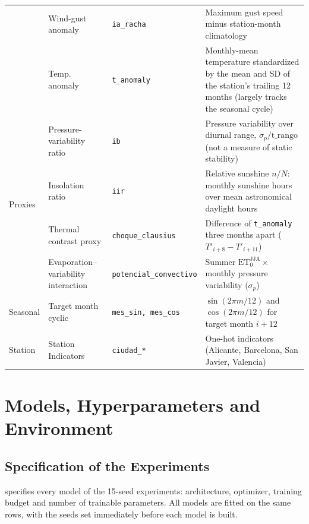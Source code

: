 \documentclass[11pt,a4paper]{article}
\begin{document}
\begin{table}[htbp]
{\begin{tabularx}{\textwidth}{lllX}
& Wind-gust anomaly & \texttt{ia\_racha} & Maximum gust speed minus station-month climatology \\
& Temp. anomaly & \texttt{t\_anomaly} & Monthly-mean temperature standardized by the mean and SD of the station's trailing 12 months (largely tracks the seasonal cycle) \\
\midrule
\multirow{4}{*}{Proxies} & Pressure-variability ratio & \texttt{ib} & Pressure variability over diurnal range, $\sigma_p / \text{t\_rango}$ (not a measure of static stability) \\
& Insolation ratio & \texttt{iir} & Relative sunshine $n/N$: monthly sunshine hours over mean astronomical daylight hours \\
& Thermal contrast proxy & \texttt{choque\_clausius} & Difference of \texttt{t\_anomaly} three months apart ($T'_{i+8} - T'_{i+11}$) \\
& Evaporation--variability interaction & \texttt{potencial\_convectivo} & Summer $\text{ET}_0^{\text{JJA}} \times$ monthly pressure variability ($\sigma_p$) \\
\midrule
Seasonal & Target month cyclic & \texttt{mes\_sin, mes\_cos} & $\sin(2\pi m / 12)$ and $\cos(2\pi m / 12)$ for target month $i+12$ \\
Station & Station Indicators & \texttt{ciudad\_*} & One-hot indicators (Alicante, Barcelona, San Javier, Valencia) \\
\bottomrule
\end{tabularx}%
}
\end{table}



\section{Models, Hyperparameters and Environment}
\label{app:models}

\subsection{Specification of the Experiments}
\label{app:architectures}

 specifies every model of the 15-seed experiments: architecture, optimizer, training budget and number of trainable parameters. All models are fitted on the same rows, with the seeds set immediately before each model is built.
\end{document}
